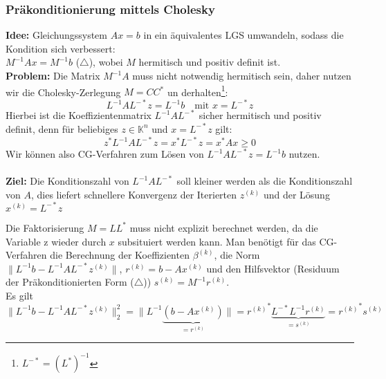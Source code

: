     \subsubsection{Präkonditionierung mittels Cholesky}
    \textbf{Idee:} Gleichungssystem $Ax=b$ in ein äquivalentes LGS umwandeln, sodass die Kondition sich verbessert:\\
    $M^{-1}Ax = M^{-1}b$ ({\scriptsize$\triangle$}), wobei $M$ hermitisch und positiv definit ist. \\
    \textbf{Problem:} Die Matrix $M^{-1}A$ muss nicht notwendig hermitisch sein, daher nutzen wir die 
    Cholesky-Zerlegung $M=CC^*$
    un derhalten\footnote{$L^{-*} = (L^*)^{-1}$}: 
    \[L^{-1}AL^{-*}z = L^{-1}b \quad \text{mit } x = L^{-*}z\]
    Hierbei ist die Koeffizientenmatrix $L^{-1}AL^{-*}$ sicher hermitisch und positiv definit, 
    denn für beliebiges $z\in\mathbb{K}^n$ und $x=L^{-*}z$ gilt: 
    \[z^*L^{-1}AL^{-*}z = x^*L^{-*}z = x^*Ax \geq 0\]
    Wir können also CG-Verfahren zum Lösen von $L^{-1}AL^{-*}z = L^{-1}b$ nutzen. \\ \\
    \textbf{Ziel:} Die Konditionszahl von $L^{-1}AL^{-*}$ soll kleiner werden als die Konditionszahl von $A$, dies 
    liefert schnellere Konvergenz der Iterierten $z^{(k)}$ und der Lösung $x^{(k)}=L^{-*}z$ 
    \begin{rembox}
        Die Faktorisierung $M=LL^*$ muss nicht explizit berechnet werden, 
        da die Variable z wieder durch $x$ subsituiert werden kann.
        Man benötigt für das CG-Verfahren die Berechnung der Koeffizienten $\beta^{(k)}$, 
        die Norm $\|L^{-1}b-L^{-1}AL^{-*}z^{(k)}\|$, $r^{(k)} = b-Ax^{(k)}$ und den Hilfsvektor 
        (Residuum der Präkonditionierten Form ({\scriptsize$\triangle$})) $s^{(k)} = M^{-1}r^{(k)}$. \\
        Es gilt 
        \[\|L^{-1}b-L^{-1}AL^{-*}z^{(k)}\|_2^2 = \|L^{-1}\underbrace{(b-Ax^{(k)})}_{=r^{(k)}}\| = 
        {r^{(k)}}^*\underbrace{L^{-*}L^{-1}r^{(k)}}_{=s^{(k)}} = {r^{(k)}}^*s^{(k)}\]
    \end{rembox}

